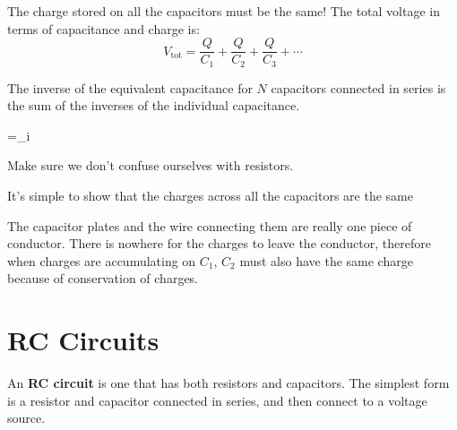 The charge stored on all the capacitors must be the same! The
total voltage in terms of capacitance and charge is:
\begin{equation}
  V_\text{tot}=\frac Q{C_1}+\frac Q{C_2}+\frac Q{C_3}+\cdots
\end{equation}





The inverse of the equivalent capacitance for $N$ capacitors connected in
series is the sum of the inverses of the individual capacitance.
\begin{important-equation}
  =\sum_i
\end{important-equation}
Make sure we don't confuse ourselves with resistors.


It's simple to show that the charges across all the capacitors are the same
\begin{center}
\end{center}
The capacitor plates and the wire connecting them are really one piece of
conductor. There is nowhere for the charges to leave the conductor, therefore
when charges are accumulating on $C_1$, $C_2$ must also have the same charge
because of conservation of charges.




\section{RC Circuits}

An \textbf{RC circuit} is one that has both resistors and capacitors. The
simplest form is a resistor and capacitor connected in series, and then
connect to a voltage source.




